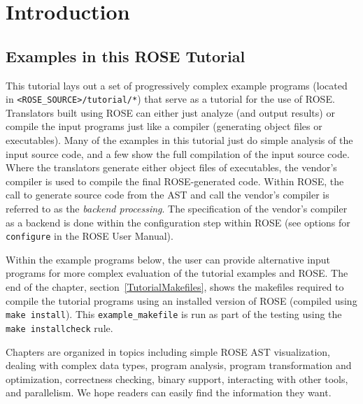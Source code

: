 \chapter{Introduction}



\section{Examples in this ROSE Tutorial}

    This tutorial lays out a set of progressively
complex example programs (located in 
{\tt <ROSE\_SOURCE>/tutorial/*}) that serve as a tutorial for the use of ROSE.
Translators built using ROSE can either just analyze (and output results)
or compile the input programs just like a compiler (generating object files 
or executables).  Many of the examples in this tutorial just do simple analysis
of the input source code, and a few show the full compilation of the input source code.
Where the translators generate either object files of executables, the 
vendor's compiler is used to compile the final ROSE-generated code.  Within
ROSE, the call to generate source code from the AST and call the vendor's compiler
is referred to as the {\em backend processing}.  The specification of the vendor's compiler
as a backend is done within the configuration step within ROSE (see options for 
{\tt configure} in the ROSE User Manual).

Within the example programs below, the user can provide alternative input programs
for more complex evaluation of the tutorial examples and ROSE.  The end of the chapter,
section~\ref{TutorialMakefiles}, shows the makefiles required to compile the
tutorial programs using an installed version of ROSE (compiled using 
{\tt make install}).  This {\tt example\_makefile} is run as part of the testing using the 
{\tt make installcheck} rule.


Chapters are organized in topics including simple ROSE AST visualization,
dealing with complex data types, program analysis, program transformation
and optimization, correctness checking, binary support, interacting with
other tools, and parallelism. 
We hope readers can easily find the information they want. 

